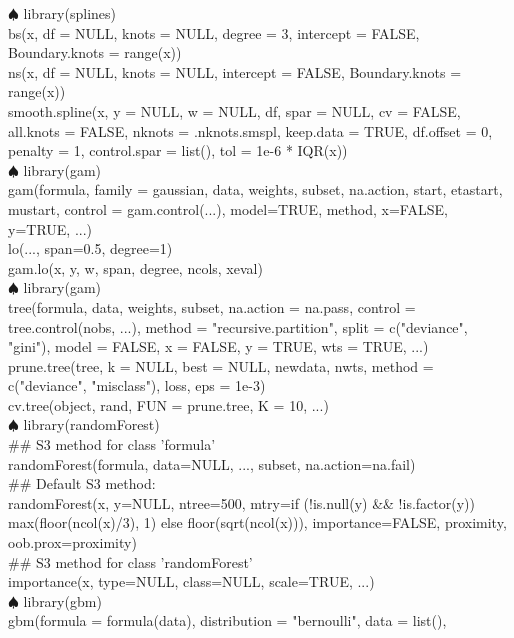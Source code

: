 \documentclass[12pt, plandscape]{article}
\begin{document}
\begin{multicols}{3}
$\spadesuit$ library(splines)\\
bs(x, df = NULL, knots = NULL, degree = 3, intercept = FALSE,
        Boundary.knots = range(x))\\
ns(x, df = NULL, knots = NULL, intercept = FALSE,
        Boundary.knots = range(x))\\
smooth.spline(x, y = NULL, w = NULL, df, spar = NULL, cv = FALSE,
                   all.knots = FALSE, nknots = .nknots.smspl,
                   keep.data = TRUE, df.offset = 0, penalty = 1,
                   control.spar = list(), tol = 1e-6 * IQR(x))\\
$\spadesuit$ library(gam)\\
gam(formula, family = gaussian, data, weights, subset, na.action, 
            start, etastart, mustart, control = gam.control(...),
     model=TRUE, method, x=FALSE, y=TRUE, ...)\\
     lo(..., span=0.5, degree=1)\\
     gam.lo(x, y, w, span, degree, ncols, xeval)\\
$\spadesuit$ library(gam)\\
tree(formula, data, weights, subset,
          na.action = na.pass, control = tree.control(nobs, ...),
          method = "recursive.partition",
          split = c("deviance", "gini"),
          model = FALSE, x = FALSE, y = TRUE, wts = TRUE, ...)\\
prune.tree(tree, k = NULL, best = NULL, newdata, nwts,
                method = c("deviance", "misclass"), loss, eps = 1e-3)\\
cv.tree(object, rand, FUN = prune.tree, K = 10, ...)\\
$\spadesuit$ library(randomForest)\\
\#\# S3 method for class 'formula'\\
     randomForest(formula, data=NULL, ..., subset, na.action=na.fail)\\
\#\# Default S3 method:\\
randomForest(x, y=NULL, ntree=500, mtry=if (!is.null(y) \&\& !is.factor(y))
                  max(floor(ncol(x)/3), 1) else floor(sqrt(ncol(x))), importance=FALSE, proximity, oob.prox=proximity)\\
\#\# S3 method for class 'randomForest'\\
     importance(x, type=NULL, class=NULL, scale=TRUE, ...)\\
$\spadesuit$ library(gbm)\\
gbm(formula = formula(data),
         distribution = "bernoulli",
         data = list(),

\end{multicols}
\end{document}
